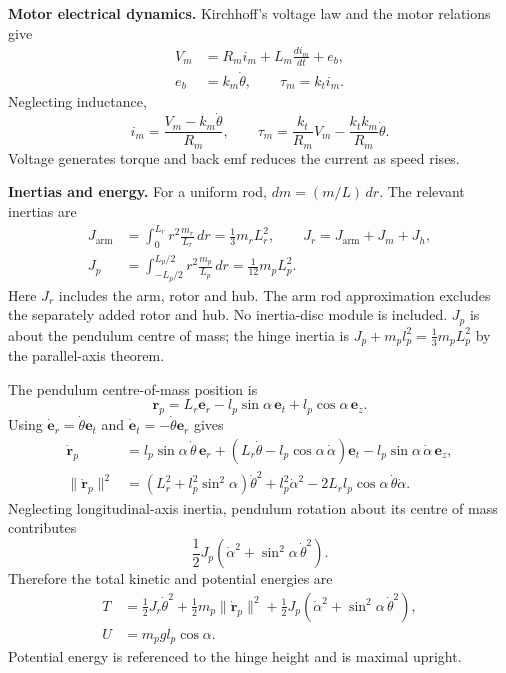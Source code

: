 \documentclass[11pt,a4paper]{article}
\begin{document}
\textbf{Motor electrical dynamics.}
Kirchhoff's voltage law and the motor relations give
\begin{align}
V_m&=R_mi_m+L_m\frac{di_m}{dt}+e_b,\\
e_b&=k_m\dot\theta,\qquad \tau_m=k_ti_m.
\end{align}
Neglecting inductance,
\begin{equation}\label{eq:motor}
i_m=\frac{V_m-k_m\dot\theta}{R_m},\qquad
\boxed{\tau_m=\frac{k_t}{R_m}V_m-\frac{k_tk_m}{R_m}\dot\theta.}
\end{equation}
Voltage generates torque and back emf reduces the current as speed rises.

\textbf{Inertias and energy.}
For a uniform rod, $dm=(m/L)\,dr$. The relevant inertias are
\begin{align}
J_{\mathrm{arm}}&=\int_0^{L_r}r^2\frac{m_r}{L_r}\,dr
=\frac13m_rL_r^2,\qquad J_r=J_{\mathrm{arm}}+J_m+J_h,\\
J_p&=\int_{-L_p/2}^{L_p/2}r^2\frac{m_p}{L_p}\,dr
=\frac1{12}m_pL_p^2.
\end{align}
Here $J_r$ includes the arm, rotor and hub. The arm rod approximation
excludes the separately added rotor and hub. No inertia-disc module is
included. $J_p$ is about the pendulum centre of mass; the hinge inertia is
$J_p+m_pl_p^2=\frac13m_pL_p^2$ by the parallel-axis theorem.

The pendulum centre-of-mass position is
\begin{equation}
\boldsymbol r_p=L_r\boldsymbol e_r-l_p\sin\alpha\,\boldsymbol e_t
+l_p\cos\alpha\,\boldsymbol e_z.
\end{equation}
Using $\dot{\boldsymbol e}_r=\dot\theta\boldsymbol e_t$ and
$\dot{\boldsymbol e}_t=-\dot\theta\boldsymbol e_r$ gives
\begin{align}
\dot{\boldsymbol r}_p&=l_p\sin\alpha\,\dot\theta\,\boldsymbol e_r
+(L_r\dot\theta-l_p\cos\alpha\,\dot\alpha)\boldsymbol e_t
-l_p\sin\alpha\,\dot\alpha\,\boldsymbol e_z,\\
\|\dot{\boldsymbol r}_p\|^2&=(L_r^2+l_p^2\sin^2\alpha)\dot\theta^2
+l_p^2\dot\alpha^2-2L_rl_p\cos\alpha\,\dot\theta\dot\alpha.
\end{align}
Neglecting longitudinal-axis inertia, pendulum rotation about its centre
of mass contributes
\[\frac12J_p(\dot\alpha^2+\sin^2\alpha\,\dot\theta^2).\]
Therefore the total kinetic and potential energies are
\begin{align}
T&=\frac12J_r\dot\theta^2+\frac12m_p\|\dot{\boldsymbol r}_p\|^2
+\frac12J_p(\dot\alpha^2+\sin^2\alpha\,\dot\theta^2),\\
U&=m_pgl_p\cos\alpha.
\end{align}
Potential energy is referenced to the hinge height and is maximal upright.
\end{document}
